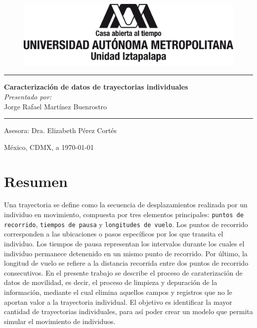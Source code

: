 \documentclass[letterpaper,11pt,spanish]{report}
\begin{document}
\thispagestyle{empty}

\begin{figure}[h]
    \centering
    \includegraphics[scale=0.6]{img/logoUAM.png}
\end{figure}

\rule{\textwidth}{0.5pt}
\begin{center}
    {\LARGE\bfseries Caracterización de datos de trayectorias individuales}\\[1.5cm]
    {\normalsize\itshape Presentado por:}\\
    {\large Jorge Rafael Martínez Buenrostro}
\end{center}
\rule{\textwidth}{0.5pt}

\vspace{2cm}
\begin{center}
    {\large Asesora: Dra. Elizabeth Pérez Cortés}    
\end{center}

\vfill  
\begin{center}
    México, CDMX, a \today
\end{center}

\vspace{2cm}

\setcounter{page}{0}
\pagestyle{plain}
\chapter*{Resumen}
Una trayectoria se define como la secuencia de desplazamientos realizada por un individuo en movimiento, compuesta por tres elementos principales: \texttt{puntos de recorrido}, \texttt{tiempos de pausa} y \texttt{longitudes de vuelo}. Los puntos de recorrido corresponden a las ubicaciones o pasos específicos por los que transita el individuo. Los tiempos de pausa representan los intervalos durante los cuales el individuo permanece detenenido en un mismo punto de recorrido. Por último, la longitud de vuelo se refiere a la distancia recorrida entre dos puntos de recorrido consecutivos. En el presente trabajo se describe el proceso de caraterización de datos de movilidad, es decir, el proceso de limpieza y depuración de la información, mediante el cual elimina aquellos campos y registros que no le aportan valor a la trayectoria individual. El objetivo es identificar la mayor cantidad de trayectorias individuales, para así poder crear un modelo que permita simular el movimiento de individuos.
\end{document}
